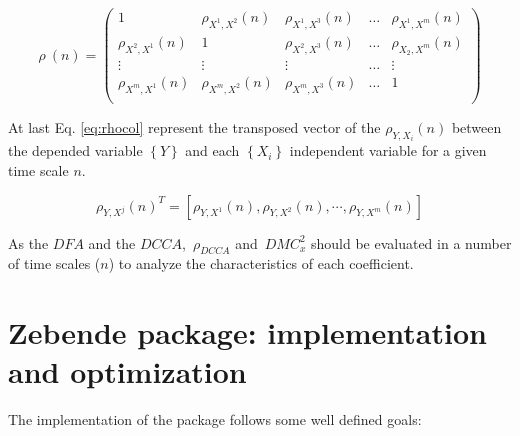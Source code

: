 \documentclass[nojss]{jss}
\begin{document}
\begin{equation}
  \rho~(n) = \left(\begin{matrix}
    1                     & \rho_{X^{1},X^{2}}(n) & \rho_{X^{1},X^{3}}(n) & \dots & \rho_{X^{1},X^{m}}(n) \\
    \rho_{X^{2},X^{1}}(n) & 1                     & \rho_{X^{2},X^{3}}(n) & \dots & \rho_{X_{2},X^{m}}(n) \\
    \vdots                & \vdots                & \vdots                & \dots & \vdots                \\
    \rho_{X^{m},X^{1}}(n) & \rho_{X^{m},X^{2}}(n) & \rho_{X^{m},X^{3}}(n) & \dots & 1                     \\
  \end{matrix}\right)
  \label{eq:p_dcca_matrix}
\end{equation}

At last Eq. \ref{eq:rhocol} represent the transposed vector of the $\rho_{Y,X_{i}}(n)$ between the depended variable $\left\lbrace Y \right\rbrace $ and each $\left\lbrace X_{i} \right\rbrace $ independent variable for a given time scale $n$.

\begin{equation} \label{eq:rhocol}
  \rho_{Y,X^{j}}(n)^T=[\rho_{Y,X^1}(n), \rho_{Y,X^2}(n),\cdots,\rho_{Y,X^m}(n)]
\end{equation}

As the $DFA$ and the $DCCA$,~$\rho_{DCCA}$ and~$DMC_x^2$ should be evaluated in a number of time scales ($n$) to analyze the characteristics of each coefficient.



\section{Zebende package: implementation and optimization} \label{sec:optimization}

The implementation of the  package follows some well defined goals:
\end{document}

